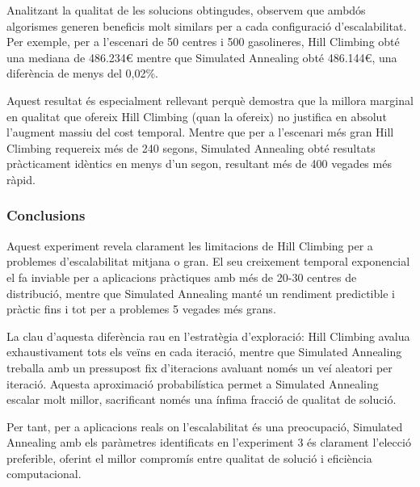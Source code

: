 \vspace{0.5cm}

\vspace{0.5cm}


\vspace{0.5cm}

Analitzant la qualitat de les solucions obtingudes, observem que ambdós algorismes generen beneficis molt similars per a cada configuració d'escalabilitat. Per exemple, per a l'escenari de 50 centres i 500 gasolineres, Hill Climbing obté una mediana de 486.234€ mentre que Simulated Annealing obté 486.144€, una diferència de menys del 0,02\%.

Aquest resultat és especialment rellevant perquè demostra que la millora marginal en qualitat que ofereix Hill Climbing (quan la ofereix) no justifica en absolut l'augment massiu del cost temporal. Mentre que per a l'escenari més gran Hill Climbing requereix més de 240 segons, Simulated Annealing obté resultats pràcticament idèntics en menys d'un segon, resultant més de 400 vegades més ràpid.

\vspace{0.5cm}


\subsubsection{Conclusions}

Aquest experiment revela clarament les limitacions de Hill Climbing per a problemes d'escalabilitat mitjana o gran. El seu creixement temporal exponencial el fa inviable per a aplicacions pràctiques amb més de 20-30 centres de distribució, mentre que Simulated Annealing manté un rendiment predictible i pràctic fins i tot per a problemes 5 vegades més grans.

La clau d'aquesta diferència rau en l'estratègia d'exploració: Hill Climbing avalua exhaustivament tots els veïns en cada iteració, mentre que Simulated Annealing treballa amb un pressupost fix d'iteracions avaluant només un veí aleatori per iteració. Aquesta aproximació probabilística permet a Simulated Annealing escalar molt millor, sacrificant només una ínfima fracció de qualitat de solució.

Per tant, per a aplicacions reals on l'escalabilitat és una preocupació, Simulated Annealing amb els paràmetres identificats en l'experiment 3 és clarament l'elecció preferible, oferint el millor compromís entre qualitat de solució i eficiència computacional.